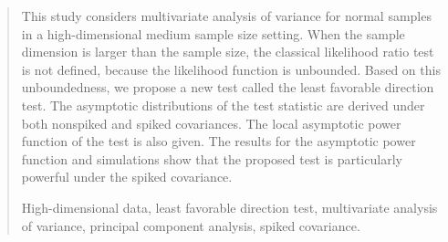 \documentclass[12pt]{article} %
\renewcommand{\theequation}{\thesection\arabic{equation}}
\theoremstyle{definition}
\begin{document}
\begin{quotation}
This study considers multivariate analysis of variance for normal samples in a high-dimensional medium sample size setting.
    When the sample dimension is larger than the sample size, the classical likelihood ratio test is not defined, because the likelihood function is unbounded.
    Based on this unboundedness, we propose a new test called the least favorable direction test.
    The asymptotic distributions of the test statistic are derived under both nonspiked and spiked covariances.
    The local asymptotic power function of the test is also given.
    The results for the asymptotic power function and simulations show that the proposed test is particularly powerful under the spiked covariance.

\vspace{9pt}
    High-dimensional data, least favorable direction test, multivariate analysis of variance, principal component analysis, spiked covariance.
\par
\end{quotation}\par



\def\thefigure{\arabic{figure}}
\def\thetable{\arabic{table}}

\renewcommand{\theequation}{\thesection.\arabic{equation}}


\fontsize{12}{14pt plus.8pt minus .6pt}\selectfont

\setcounter{section}{1} %
\setcounter{equation}{0} %
\end{document}
